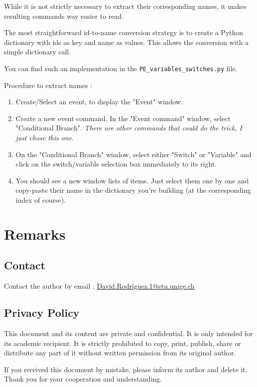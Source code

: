 \documentclass[11pt]{article}
\begin{document}
While it is not strictly necessary to extract their corresponding names, it makes resulting commands way easier to read.

The most straightforward id-to-name conversion strategy is to create a Python dictionary with ids as key and name as values. This allows the conversion with a simple dictionary call.

You can find such an implementation in the \verb|PE_variables_switches.py| file.

Procedure to extract names :
\begin{enumerate}
	\item Create/Select an event, to display the "Event" window.
	
	\item Create a new event command. In the "Event command" window, select "Conditional Branch". \textit{There are other commands that could do the trick, I just chose this one}.
	
	\item On the "Conditional Branch" window, select either "Switch" or "Variable" and click on the switch/variable selection box immediately to its right.
	
	\item You should see a new window lists of items. Just select them one by one and copy-paste their name in the dictionary you're building (at the corresponding index of course).
\end{enumerate}


\newpage
\section{Remarks}

\subsection{Contact}

Contact the author by email : \href{mailto:David.Rodriguez.1@etu.unige.ch}{David.Rodriguez.1@etu.unige.ch}

\subsection{Privacy Policy}
\label{sec:privacypolice}

This document and its content are private and confidential. It is only intended for its academic recipient. It is strictly prohibited to copy, print, publish, share or distribute any part of it without written permission from its original author.

If you received this document by mistake, please inform its author and delete it. Thank you for your cooperation and understanding.
\end{document}
